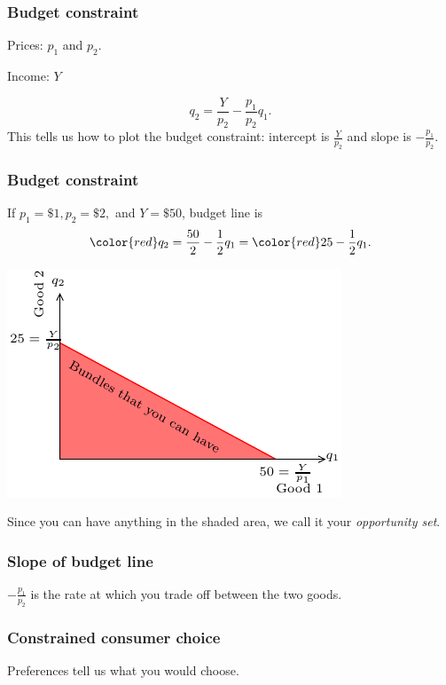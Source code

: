 \documentclass[xcolor=pdftex,dvipsnames]{beamer}
\begin{document}
\begin{frame}
\frametitle{Budget constraint}
Prices: $p_1$ and $p_2$.
\bigskip


Income: $Y$
\bigskip




{
\[q_2 = \frac{Y}{p_2}-\frac{p_1}{p_2}q_1.
\]
This tells us how to plot the budget constraint: intercept is
$\frac{Y}{p_2}$ and slope is $ -\frac{p_1}{p_2}$.
}
\end{frame}
\begin{frame}
\frametitle{Budget constraint}
If $p_1 = \$1, p_2=\$2,$ and $Y=\$50$, budget line is
\[
{\color{red}q_2} = \frac{50}{2} - \frac{1}{2}q_1 = {\color{red}25-\frac{1}{2}q_1}.
\]
\begin{center}\includegraphics{pics/BudgetConstraint}\end{center}
Since you can have anything in the shaded area, we call it your
\emph{opportunity set}.
\end{frame}
\begin{frame}
\frametitle{Slope of budget line}
$-\frac{p_1}{p_2}$ is the rate at which you trade off between the two
goods.
\bigskip

\bigskip

\end{frame}

\begin{frame}
\frametitle{Constrained consumer choice}
Preferences tell us what you would choose.

\bigskip{}


\bigskip{}


\end{frame}
\end{document}
